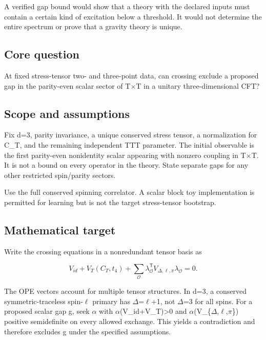 \documentclass[
  11pt,
]{article}
\begin{document}
A verified gap bound would show that a theory with the declared inputs
must contain a certain kind of excitation below a threshold. It would
not determine the entire spectrum or prove that a gravity theory is
unique.

\subsection{Core question}

At fixed stress-tensor two- and three-point data, can crossing exclude a
proposed gap in the parity-even scalar sector of T\ensuremath{\times}T
in a unitary three-dimensional CFT?

\subsection{Scope and assumptions}

Fix d=3, parity invariance, a unique conserved stress tensor, a
normalization for C\_T, and the remaining independent TTT parameter. The
initial observable is the first parity-even nonidentity scalar appearing
with nonzero coupling in T\ensuremath{\times}T. It is not a bound on
every operator in the theory. State separate gaps for any other
restricted spin/parity sectors.

Use the full conserved spinning correlator. A scalar block toy
implementation is permitted for learning but is not the target
stress-tensor bootstrap.

\subsection{Mathematical target}

Write the crossing equations in a nonredundant tensor basis as

\[V_{id}+V_T(C_T,t_4)+\sum_{\mathcal O}\lambda_{\mathcal O}^{\mathsf T}V_{\Delta ,\ell ,\pi}\lambda_{\mathcal O}=0.\]

The OPE vectors account for multiple tensor structures. In d=3, a
conserved symmetric-traceless spin-\ensuremath{\ell} primary has
\ensuremath{\Delta}=\ensuremath{\ell}+1, not \ensuremath{\Delta}=3 for
all spins. For a proposed scalar gap g, seek \ensuremath{\alpha} with
\ensuremath{\alpha}(V\_id+V\_T)>0 and
\ensuremath{\alpha}(V\_\{\ensuremath{\Delta},\ensuremath{\ell},\ensuremath{\pi}\})
positive semidefinite on every allowed exchange. This yields a
contradiction and therefore excludes g under the specified assumptions.
\end{document}
